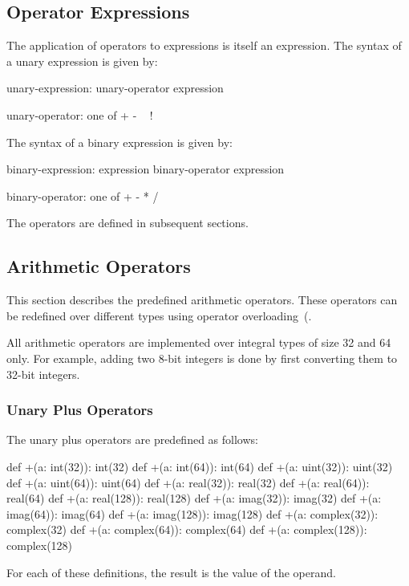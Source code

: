 \subsection{Operator Expressions}
\label{Binary_Expressions}
\label{Unary_Expressions}

The application of operators to expressions is itself an expression.
The syntax of a unary expression is given by:
\begin{syntax}
unary-expression:
  unary-operator expression

unary-operator: one of
  + - ~ !
\end{syntax}

The syntax of a binary expression is given by:
\begin{syntax}
binary-expression:
  expression binary-operator expression

binary-operator: one of
  + - * / %
\end{syntax}

The operators are defined in subsequent sections.

\subsection{Arithmetic Operators}
\label{Arithmetic_Operators}

This section describes the predefined arithmetic operators.  These
operators can be redefined over different types using operator
overloading~(.

All arithmetic operators are implemented over integral types of size
32 and 64 only.  For example, adding two 8-bit integers is done by
first converting them to 32-bit integers.

\subsubsection{Unary Plus Operators}
\label{Unary_Plus_Operators}

The unary plus operators are predefined as follows:
\begin{chapel}
def +(a: int(32)): int(32)
def +(a: int(64)): int(64)
def +(a: uint(32)): uint(32)
def +(a: uint(64)): uint(64)
def +(a: real(32)): real(32)
def +(a: real(64)): real(64)
def +(a: real(128)): real(128)
def +(a: imag(32)): imag(32)
def +(a: imag(64)): imag(64)
def +(a: imag(128)): imag(128)
def +(a: complex(32)): complex(32)
def +(a: complex(64)): complex(64)
def +(a: complex(128)): complex(128)
\end{chapel}
For each of these definitions, the result is the value of the operand.

